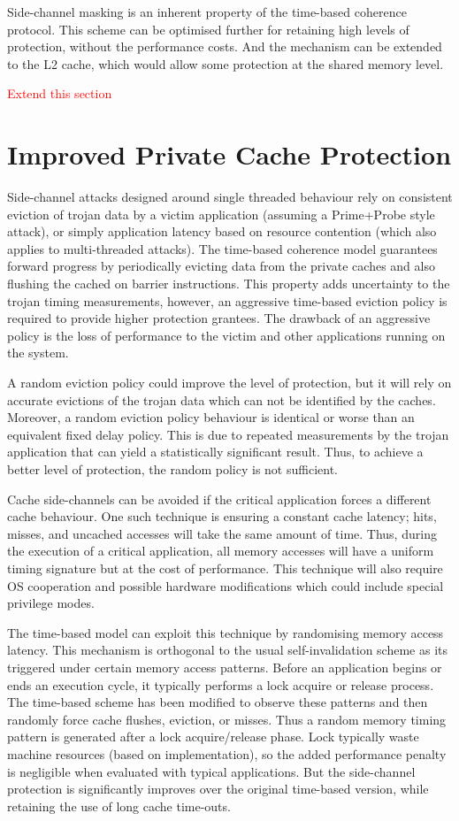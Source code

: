 	Side-channel masking is an inherent property of the time-based coherence protocol. This scheme can be optimised further for retaining high levels of protection, without the performance costs. And the mechanism can be extended to the L2 cache, which would allow some protection at the shared memory level.
	
	\textcolor{red}{Extend this section}
	
\section{Improved Private Cache Protection}

	Side-channel attacks designed around single threaded behaviour rely on consistent eviction of trojan data by a victim application (assuming a Prime+Probe style attack), or simply application latency based on resource contention (which also applies to multi-threaded attacks). The time-based coherence model guarantees forward progress by periodically evicting data from the private caches and also flushing the cached on barrier instructions. This property adds uncertainty to the trojan timing measurements, however, an aggressive time-based eviction policy is required to provide higher protection grantees. The drawback of an aggressive policy is the loss of performance to the victim and other applications running on the system. 
	
	A random eviction policy could improve the level of protection, but it will rely on accurate evictions of the trojan data which can not be identified by the caches. Moreover, a random eviction policy behaviour is identical or worse than an equivalent fixed delay policy. This is due to repeated measurements by the trojan application that can yield a statistically significant result. Thus, to achieve a better level of protection, the random policy is not sufficient.
	
	Cache side-channels can be avoided if the critical application forces a different cache behaviour. One such technique is ensuring a constant cache latency; hits, misses, and uncached accesses will take the same amount of time. Thus, during the execution of a critical application, all memory accesses will have a uniform timing signature but at the cost of performance. This technique will also require OS cooperation and possible hardware modifications which could include special privilege modes.
	
	The time-based model can exploit this technique by randomising memory access latency. This mechanism is orthogonal to the usual self-invalidation scheme as its triggered under certain memory access patterns. Before an application begins or ends an execution cycle, it typically performs a lock acquire or release process. The time-based scheme has been modified to observe these patterns and then randomly force cache flushes, eviction, or misses. Thus a random memory timing pattern is generated after a lock acquire/release phase. Lock typically waste machine resources (based on implementation), so the added performance penalty is negligible when evaluated with typical applications. But the side-channel protection is significantly improves over the original time-based version, while retaining the use of long cache time-outs.
	
